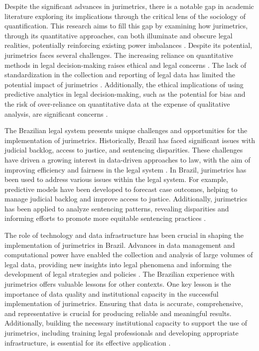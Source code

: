 Despite the significant advances in jurimetrics, there is a notable gap in academic literature exploring its implications through the critical lens of the sociology of quantification. This research aims to fill this gap by examining how jurimetrics, through its quantitative approaches, can both illuminate and obscure legal realities, potentially reinforcing existing power imbalances \cite{10.1057/s41599-020-00557-0,10.1590/dados.2022.65.3.267}. Despite its potential, jurimetrics faces several challenges. The increasing reliance on quantitative methods in legal decision-making raises ethical and legal concerns \cite{jurimetricschallenges}. The lack of standardization in the collection and reporting of legal data has limited the potential impact of jurimetrics \cite{jurimetricschallenges}. Additionally, the ethical implications of using predictive analytics in legal decision-making, such as the potential for bias and the risk of over-reliance on quantitative data at the expense of qualitative analysis, are significant concerns \cite{jurimetricschallenges}.

The Brazilian legal system presents unique challenges and opportunities for the implementation of jurimetrics. Historically, Brazil has faced significant issues with judicial backlog, access to justice, and sentencing disparities. These challenges have driven a growing interest in data-driven approaches to law, with the aim of improving efficiency and fairness in the legal system \cite{garcia2020}. In Brazil, jurimetrics has been used to address various issues within the legal system. For example, predictive models have been developed to forecast case outcomes, helping to manage judicial backlog and improve access to justice. Additionally, jurimetrics has been applied to analyze sentencing patterns, revealing disparities and informing efforts to promote more equitable sentencing practices \cite{silva2019}.

The role of technology and data infrastructure has been crucial in shaping the implementation of jurimetrics in Brazil. Advances in data management and computational power have enabled the collection and analysis of large volumes of legal data, providing new insights into legal phenomena and informing the development of legal strategies and policies \cite{martins2021}. The Brazilian experience with jurimetrics offers valuable lessons for other contexts. One key lesson is the importance of data quality and institutional capacity in the successful implementation of jurimetrics. Ensuring that data is accurate, comprehensive, and representative is crucial for producing reliable and meaningful results. Additionally, building the necessary institutional capacity to support the use of jurimetrics, including training legal professionals and developing appropriate infrastructure, is essential for its effective application \cite{ferreira2020}.

